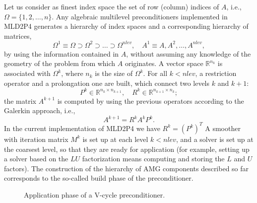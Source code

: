 Let us consider as finest index space the set of row (column) indices of $A$, i.e.,
$\Omega = \{1, 2, \ldots, n\}$. 
Any algebraic multilevel preconditioners implemented in MLD2P4 generates
a hierarchy of index spaces and a corresponding hierarchy of matrices,
\[ \Omega^1 \equiv \Omega \supset \Omega^2 \supset \ldots \supset \Omega^{nlev},
\quad A^1 \equiv A, A^2, \ldots, A^{nlev}, \]
by using the information contained in $A$, without assuming any
knowledge of the geometry of the problem from which $A$ originates.
A vector space $\mathbb{R}^{n_{k}}$ is associated with $\Omega^k$,
where $n_k$ is the size of $\Omega^k$.
For all $k < nlev$, a restriction operator and a prolongation one are built,
which connect two levels $k$ and $k+1$:
\[
    P^k \in \mathbb{R}^{n_k \times n_{k+1}}, \quad 
    R^k \in \mathbb{R}^{n_{k+1}\times n_k};
\]
the matrix $A^{k+1}$ is computed by using the previous operators according
to the Galerkin approach, i.e.,
\[
  A^{k+1}=R^kA^kP^k.
\]
In the current implementation of MLD2P4 we have $R^k=(P^k)^T$
A smoother with iteration matrix $M^k$ is set up at each level $k < nlev$, and a solver
is set up at the coarsest level, so that they are ready for application 
(for example, setting up a solver based on the $LU$ factorization means computing
and storing the $L$ and $U$ factors). The construction of the hierarchy of AMG components
described so far corresponds to the so-called build phase of the preconditioner.

\begin{figure}[t]
\begin{center} 
\caption{Application phase of a V-cycle preconditioner.\label{fig:application_alg}}
\end{center}
\end{figure}

